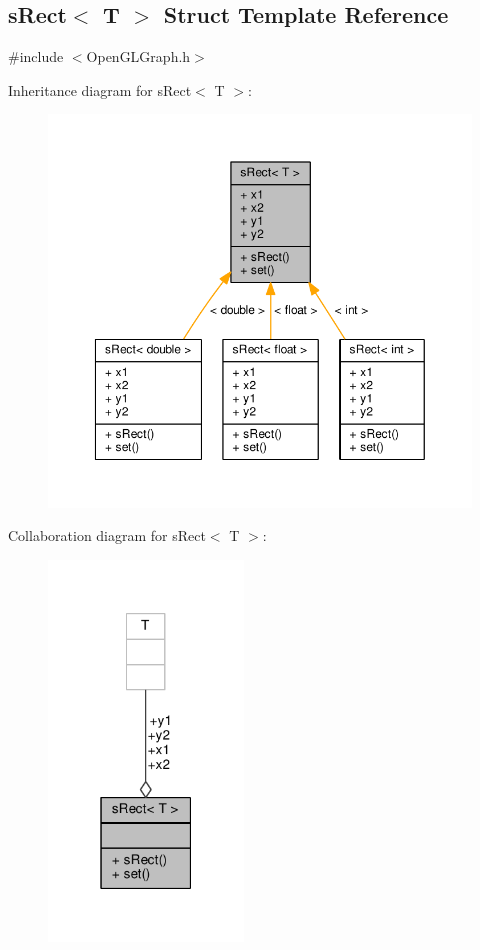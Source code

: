 \subsection{s\+Rect$<$ T $>$ Struct Template Reference}
\label{structsRect}


{\ttfamily \#include $<$Open\+G\+L\+Graph.\+h$>$}



Inheritance diagram for s\+Rect$<$ T $>$\+:
\nopagebreak
\begin{figure}[H]
\begin{center}
\leavevmode
\includegraphics[width=350pt]{db/df9/structsRect__inherit__graph}
\end{center}
\end{figure}


Collaboration diagram for s\+Rect$<$ T $>$\+:
\nopagebreak
\begin{figure}[H]
\begin{center}
\leavevmode
\includegraphics[width=147pt]{d1/dfe/structsRect__coll__graph}
\end{center}
\end{figure}
